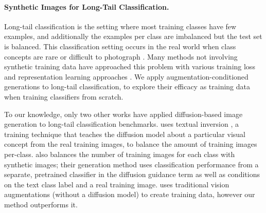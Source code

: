 \vspace{-0.3cm}
\paragraph{Synthetic Images for Long-Tail Classification.}
Long-tail classification is the setting where most training classes have few examples, and additionally the examples per class are imbalanced but the test set is balanced. This classification setting occurs in the real world when class concepts are rare or difficult to photograph \citep{inaturalist, imagenetLT}. Many methods not involving synthetic training data have approached this problem with various training loss and representation learning approaches \citep{decouple-lt, balanced_softmax, imagenetLT}. 
We apply augmentation-conditioned generations to long-tail classification, to explore their efficacy as training data when training classifiers from scratch.

To our knowledge, only two other works have applied diffusion-based image generation to long-tail classification benchmarks. \cite{fill-up-lt} uses textual inversion \cite{text_inversion}, a training technique that teaches the diffusion model about a particular visual concept from the real training images, to balance the amount of training images per-class. \cite{feedbackguided} also balances the number of training images for each class with synthetic images; their generation method uses classification performance from a separate, pretrained classifier in the diffusion guidance term as well as conditions on the text class label and a real training image. 
\cite{best_non_synthetic_imagenetlt} uses traditional vision augmentations (without a diffusion model) to create training data, however our method outperforms it.

\vspace{-0.3cm}
